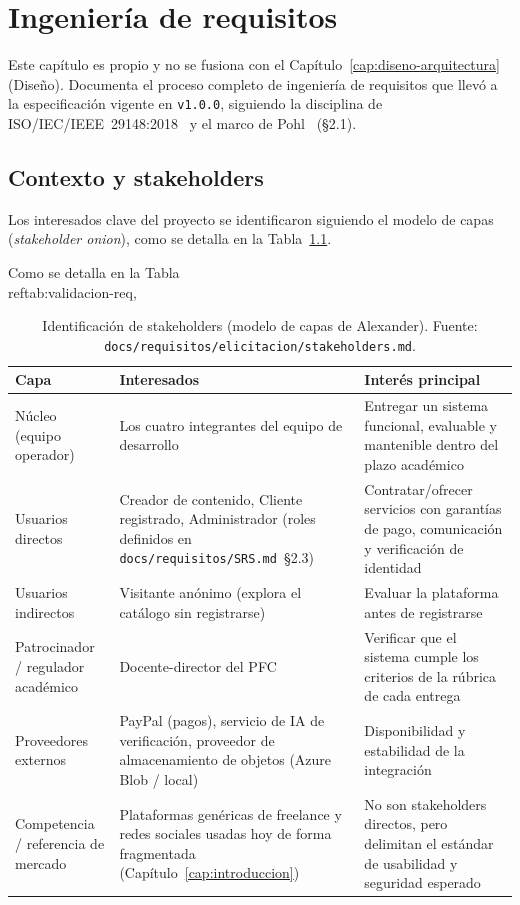 
\chapter{Ingeniería de requisitos}
\label{cap:ingenieria-requisitos}

Este capítulo es propio y no se fusiona con el Capítulo~\ref{cap:diseno-arquitectura}
(Diseño). Documenta el proceso completo de ingeniería de requisitos que
llevó a la especificación vigente en \texttt{v1.0.0}, siguiendo la
disciplina de ISO/IEC/IEEE~29148:2018~\cite{ISO29148} y el marco de
Pohl~\cite{POHL2010} (\S2.1).

\section{Contexto y stakeholders}

Los interesados clave del proyecto se identificaron siguiendo el modelo de
capas (\emph{stakeholder onion}), como se detalla en la Tabla~\ref{tab:stakeholders}.

Como se detalla en la Tabla~\\ref{tab:validacion-req}, 
\begin{table}[H]
\centering
\caption{Identificación de stakeholders (modelo de capas de Alexander). Fuente: \texttt{docs/requisitos/elicitacion/stakeholders.md}.}
\label{tab:stakeholders}
\begin{tabular}{@{}p{2.6cm}p{5.2cm}p{6.2cm}@{}}
\toprule
\textbf{Capa} & \textbf{Interesados} & \textbf{Interés principal} \\
\midrule
Núcleo (equipo operador) & Los cuatro integrantes del equipo de desarrollo &
  Entregar un sistema funcional, evaluable y mantenible dentro del plazo
  académico \\
Usuarios directos & Creador de contenido, Cliente registrado, Administrador
  (roles definidos en \texttt{docs/requisitos/SRS.md}~\S2.3) &
  Contratar/ofrecer servicios con garantías de pago, comunicación y
  verificación de identidad \\
Usuarios indirectos & Visitante anónimo (explora el catálogo sin
  registrarse) & Evaluar la plataforma antes de registrarse \\
Patrocinador / regulador académico & Docente-director del PFC & Verificar
  que el sistema cumple los criterios de la rúbrica de cada entrega \\
Proveedores externos & PayPal (pagos), servicio de IA de verificación,
  proveedor de almacenamiento de objetos (Azure Blob / local) &
  Disponibilidad y estabilidad de la integración \\
Competencia / referencia de mercado & Plataformas genéricas de freelance y
  redes sociales usadas hoy de forma fragmentada
  (Capítulo~\ref{cap:introduccion}) & No son stakeholders directos, pero
  delimitan el estándar de usabilidad y seguridad esperado \\
\bottomrule
\end{tabular}
\end{table}

